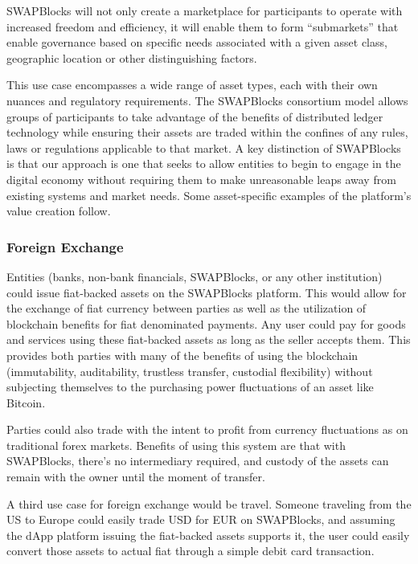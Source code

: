 \documentclass[12pt]{article}
\begin{document}
SWAPBlocks will not only create a marketplace for participants to operate with increased freedom and efficiency, 
it will enable them to form “submarkets” that enable governance based on specific needs associated with a given 
asset class, geographic location or other distinguishing factors.

This use case encompasses a wide range of asset types, each with their own nuances and regulatory requirements. 
The SWAPBlocks consortium model allows groups of participants to take advantage of the benefits of distributed 
ledger technology while ensuring their assets are traded within the confines of any rules, laws or regulations 
applicable to that market. A key distinction of SWAPBlocks is that our approach is one that seeks to allow entities 
to begin to engage in the digital economy without requiring them to make unreasonable leaps away from existing 
systems and market needs. Some asset-specific examples of the platform’s value creation follow.

\subsubsection{Foreign Exchange}

Entities (banks, non-bank financials, SWAPBlocks, or any other institution) could issue fiat-backed assets on 
the SWAPBlocks platform. This would allow for the exchange of fiat currency between parties as well as the utilization 
of blockchain benefits for fiat denominated payments. Any user could pay for goods and services using these fiat-backed 
assets as long as the seller accepts them. This provides both parties with many of the benefits of using the 
blockchain (immutability, auditability, trustless transfer, custodial flexibility) without subjecting themselves to 
the purchasing power fluctuations of an asset like Bitcoin.

Parties could also trade with the intent to profit from currency fluctuations as on traditional forex markets. Benefits of 
using this system are that with SWAPBlocks, there’s no intermediary required, and custody of the assets can remain 
with the owner until the moment of transfer.

A third use case for foreign exchange would be travel. Someone traveling from the US to Europe could easily trade 
USD for EUR on SWAPBlocks, and assuming the dApp platform issuing the fiat-backed assets supports it, the user 
could easily convert those assets to actual fiat through a simple debit card transaction.
\end{document}
